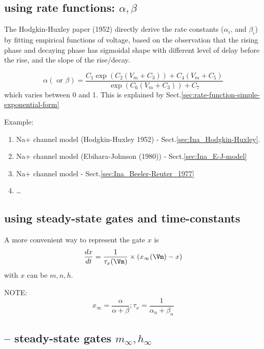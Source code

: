 \subsection{using rate functions: $\alpha, \beta$}
\label{sec:rate-function-HH}
\label{sec:HH-rate-function}

The Hodgkin-Huxley paper (1952) directly derive the rate constants ($\alpha_i$,
and $\beta_i$) by fitting empirical functions of voltage, based on the
observation that the rising phase and decaying phase has sigmoidal shape with
different level of delay before the rise, and the slope of the rise/decay.

\begin{equation}
\alpha (\text{ or } \beta) = \frac{C_1 \exp\left( C_2 (V_m + C_3) \right) + C_4
(V_m + C_5)}{\exp\left(C_6 (V_m + C_3)\right) + C_7}
\end{equation}
which varies between 0 and 1. This is explained by Sect.\ref{sec:rate-function-simple-exponential-form}

Example:
\begin{enumerate}
  \item Na+ channel model (Hodgkin-Huxley 1952) -
  Sect.\ref{sec:Ina_Hodgkin-Huxley}.

  \item Na+ channel model (Ebihara-Johnson (1980)) -
  Sect.\ref{sec:Ina_E-J-model}

  \item Na+ channel model - Sect.\ref{sec:Ina_Beeler-Reuter_1977}

  \item \ldots
\end{enumerate}

\subsection{using steady-state gates and time-constants}

A more convenient way to represent the gate $x$ is
\begin{equation}
\frac{dx}{dt} = \frac{1}{\tau_x(\Vm)}\times \left( x_\infty(\Vm) - x \right)
\end{equation}
with $x$ can be $m,n,h$.

NOTE:
\begin{equation}
x_\infty = \frac{\alpha}{\alpha+\beta}; \tau_x = \frac{1}{\alpha_n+\beta_n}
\end{equation}


\subsection{-- steady-state gates $m_\infty, h_\infty$}
\label{sec:gate-kinetics-using-steady-state-formulas}

